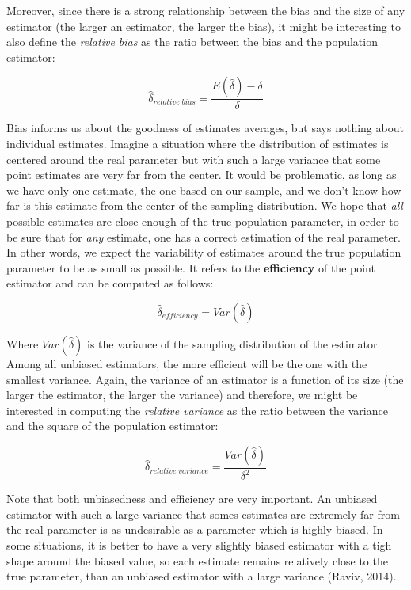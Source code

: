 \documentclass[
  man,floatsintext]{apa6}
\begin{document}
Moreover, since there is a strong relationship between the bias and the size of any estimator (the larger an estimator, the larger the bias), it might be interesting to also define the \emph{relative bias} as the ratio between the bias and the population estimator:

\begin{equation} 
\hat{\delta}_{relative \; bias}=\frac{E(\hat{\delta})-\delta}{\delta}
\label{eq:RELBIAS}
\end{equation}

Bias informs us about the goodness of estimates averages, but says nothing about individual estimates. Imagine a situation where the distribution of estimates is centered around the real parameter but with such a large variance that some point estimates are very far from the center. It would be problematic, as long as we have only one estimate, the one based on our sample, and we don't know how far is this estimate from the center of the sampling distribution. We hope that \emph{all} possible estimates are close enough of the true population parameter, in order to be sure that for \emph{any} estimate, one has a correct estimation of the real parameter. In other words, we expect the variability of estimates around the true population parameter to be as small as possible. It refers to the \textbf{efficiency} of the point estimator and can be computed as follows:

\begin{equation} 
\hat{\delta}_{efficiency}=Var(\hat{\delta})
\label{eq:EFFICIENCY}
\end{equation}

Where \(Var(\hat{\delta})\) is the variance of the sampling distribution of the estimator. Among all unbiased estimators, the more efficient will be the one with the smallest variance. Again, the variance of an estimator is a function of its size (the larger the estimator, the larger the variance) and therefore, we might be interested in computing the \emph{relative variance} as the ratio between the variance and the square of the population estimator:

\begin{equation} 
\hat{\delta}_{relative \; variance}=\frac{Var(\hat{\delta})}{\delta^2}
\label{eq:RELBIAS}
\end{equation}

Note that both unbiasedness and efficiency are very important. An unbiased estimator with such a large variance that somes estimates are extremely far from the real parameter is as undesirable as a parameter which is highly biased. In some situations, it is better to have a very slightly biased estimator with a tigh shape around the biased value, so each estimate remains relatively close to the true parameter, than an unbiased estimator with a large variance (Raviv, 2014).
\end{document}
